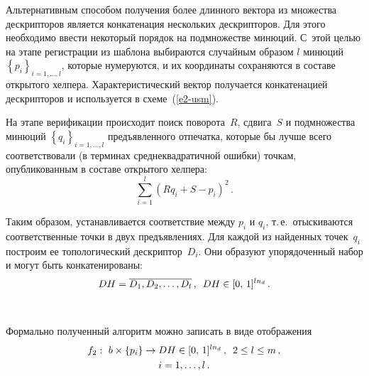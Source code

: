 \begin{multicols}{2}
      Альтернативным способом получения более длинного вектора из множества 
дескрипторов является конкатенация нескольких дескрипторов. Для этого необходимо 
ввести некоторый порядок на подмножестве минюций. С~этой целью на этапе 
регистрации из шаблона выбираются случайным образом $l$ минюций 
$\left\{p_i\right\}_{i=1,\ldots ,l}$, которые нумеруются, и их координаты сохраняются в 
составе открытого хелпера. Характеристический вектор получается конкатенацией 
дескрипторов и используется в схеме~(\ref{e2-usm}).
      
      На этапе верификации происходит поиск поворота~$R$, сдвига~$S$ и 
подмножества минюций $\left\{q_i\right\}_{i=1,\ldots ,l}$ предъявленного отпечатка, которые бы 
лучше всего соответствовали (в терминах среднеквадратичной ошибки) точкам, 
опубликованным в составе открытого хелпера:
      \begin{equation*}
      \sum\limits_{i=1}^l \left( Rq_i+S-p_i\right)^2\,.
      \end{equation*}
      
      Таким образом, устанавливается соответствие между $p_i$ и $q_i$, т.\,е.\ 
отыскиваются соответственные точки в двух предъявлениях. Для каждой из найден\-ных 
точек~$q_i$ построим ее топологический дескриптор~$D_i$. Они образуют 
упорядоченный набор и могут быть конкатенированы:
      \begin{equation*}
      DH=\overline{D_1, D_2, \ldots , D_l}\,,\enskip DH\in [0,\,1]^{ln_d}\,.
      \end{equation*}
      
      \begin{figure*} %
 \vspace*{1pt}
 \begin{center}
 \mbox{%
 \epsfxsize=124.286mm
 }
 \end{center}
 \vspace*{-9pt}
\end{figure*}
      
      Формально полученный алгоритм можно записать в виде отображения
      \begin{multline*}
      f_2:\ b\times \left\{ p_i\right\} \rightarrow DH\in [0,\,1]^{ln_d}\,,\enskip 
      2\leq l\leq m\,,\\
      i=1,  \ldots , l\,.
      \end{multline*}
      

\end{multicols}
